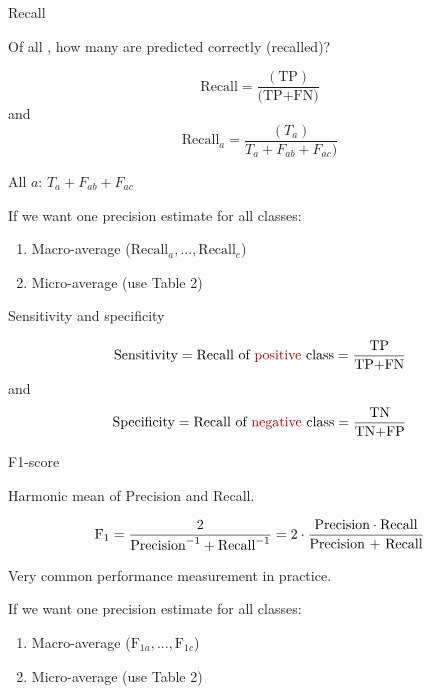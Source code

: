 \documentclass[10pt,handout]{beamer}
\begin{document}
\begin{frame}{Recall}

Of all , how many are predicted correctly (recalled)?\pause

\[
\text{Recall} = \frac{(\text{TP})}{\text{(TP+FN)}}
\]
and
\[
\text{Recall}_a =  \frac{(T_a)}{T_a + F_{ab} + F_{ac})}
\]

All  $a$: $T_a + F_{ab} + F_{ac}$

If we want one precision estimate for all classes:
\begin{enumerate}
\item Macro-average ($\text{Recall}_a, ..., \text{Recall}_c$)
\item Micro-average (use Table 2)
\end{enumerate}



\end{frame}

\begin{frame}{Sensitivity and specificity}

\[
\text{Sensitivity} = \text{Recall of \uured{positive} class} =  \frac{\text{TP}}{\text{TP+FN}}
\]
and
\[
\text{Specificity} = \text{Recall of \uured{negative} class} =\frac{\text{TN}}{\text{TN+FP}}
\]

\end{frame}


\begin{frame}{F1-score}

Harmonic mean of Precision and Recall.

\[
\text{F}_1 = \frac{2}{\text{Precision}^{-1} + \text{Recall}^{-1}} = 2 \cdot \frac{\text{Precision} \cdot \text{Recall}}{\text{\text{Precision} + \text{Recall}}}
\]

Very common performance measurement in practice.

If we want one precision estimate for all classes:
\begin{enumerate}
\item Macro-average ($\text{F}_{1a}, ..., \text{F}_{1c}$)
\item Micro-average (use Table 2)
\end{enumerate}

\end{frame}
\end{document}
